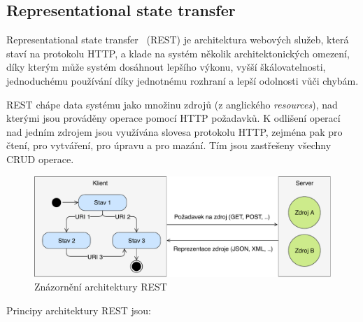 \subsection{Representational state transfer}\label{sec:rest}

Representational state transfer~\cite{fielding2000rest} (\gls{REST}) je architektura
webových služeb, která staví na protokolu \gls{HTTP}, a klade na systém
několik architektonických omezení, díky kterým může systém dosáhnout
lepšího výkonu, vyšší škálovatelnosti, jednoduchému používání díky jednotnému rozhraní
a lepší odolnosti vůči chybám.

\gls{REST} chápe data systému jako množinu zdrojů (z anglického \textit{resources}),
nad kterými jsou prováděny operace pomocí \gls{HTTP} požadavků. K odlišení operací
nad jedním zdrojem jsou využívána slovesa protokolu \gls{HTTP}, zejména pak  pro čtení,
 pro vytváření,  pro úpravu a  pro mazání. Tím jsou zastřešeny
všechny \gls{CRUD} operace.

\begin{figure}[t]
    \centering
    \includegraphics[keepaspectratio=true, width=0.9\linewidth]{figures/rest-statelessness.pdf}
    \caption{Znázornění architektury \gls{REST}}
    \label{fig:rest-statelessness}
\end{figure}

Principy architektury \gls{REST} jsou:

